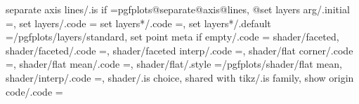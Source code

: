{{{{{{{{{{{{{{{{{{{{{{{{{{{{{{{{{{{{{{{{{{{{{{{{{{{{{{{{{{{{{{{{{{{{{{{{{{{{{{{separate axis lines/.is if                                         =pgfplots@separate@axis@lines,                                                                                                      
@set layers arg/.initial                                           =,                                                                                                                                  
set layers/.code                                                   ={%
set layers*/.code                                                  =,                                                                                                      
set layers*/.default                                               ={/pgfplots/layers/standard},                                                                                                       
set point meta if empty/.code                                      ={%
shader/faceted,
shader/faceted/.code                                               ={\def\pgfplotsplothandlermesh@shader{1}},                                                                                          
shader/faceted interp/.code                                        ={\def\pgfplotsplothandlermesh@shader{3}},                                                                                          
shader/flat corner/.code                                           ={\def\pgfplotsplothandlermesh@shader{0}\def\pgfplotsplothandlermesh@flatmode{c}},                                                  
shader/flat mean/.code                                             ={\def\pgfplotsplothandlermesh@shader{0}\def\pgfplotsplothandlermesh@flatmode{m}},                                                  
shader/flat/.style                                                 ={/pgfplots/shader/flat mean},%
shader/interp/.code                                                ={\def\pgfplotsplothandlermesh@shader{2}},                                                                                          
shader/.is choice,
shared with tikz/.is family,
show origin code/.code                                             ={%
}}}}}}}}}}}}}}}}}}}}}}}}}}}}}}}}}}}}}}}}}}}}}}}}}}}}}}}}}}}}}}}}}}}}}}}}}}}}}}}}}}
